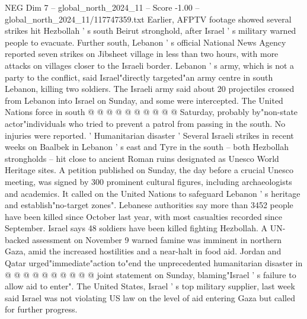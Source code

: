 \begin{textsample}{NEG Dim 7 – global\_north\_2024\_11 – Score -1.00 – global\_north\_2024\_11/117747359.txt}
Earlier, AFPTV footage showed several strikes hit Hezbollah ' s south Beirut stronghold, after Israel ' s military warned people to evacuate.
Further south, Lebanon ' s official National News Agency reported seven strikes on Jibsheet village in less than two hours, with more attacks on villages closer to the Israeli border.
Lebanon ' s army, which is not a party to the conflict, said Israel"directly targeted"an army centre in south Lebanon, killing two soldiers.
The Israeli army said about 20 projectiles crossed from Lebanon into Israel on Sunday, and some were intercepted.
The United Nations force in south @ @ @ @ @ @ @ @ @ @ Saturday, probably by"non-state actor"individuals who tried to prevent a patrol from passing in the south.
No injuries were reported. ' Humanitarian disaster ' Several Israeli strikes in recent weeks on Baalbek in Lebanon ' s east and Tyre in the south -- both Hezbollah strongholds -- hit close to ancient Roman ruins designated as Unesco World Heritage sites.
A petition published on Sunday, the day before a crucial Unesco meeting, was signed by 300 prominent cultural figures, including archaeologists and academics.
It called on the United Nations to safeguard Lebanon ' s heritage and establish"no-target zones".
Lebanese authorities say more than 3452 people have been killed since October last year, with most casualties recorded since September.
Israel says 48 soldiers have been killed fighting Hezbollah.
A UN-backed assessment on November 9 warned famine was imminent in northern Gaza, amid the increased hostilities and a near-halt in food aid.
Jordan and Qatar urged"immediate"action to"end the unprecedented humanitarian disaster in @ @ @ @ @ @ @ @ @ @ joint statement on Sunday, blaming"Israel ' s failure to allow aid to enter".
The United States, Israel ' s top military supplier, last week said Israel was not violating US law on the level of aid entering Gaza but called for further progress.

\end{textsample}
